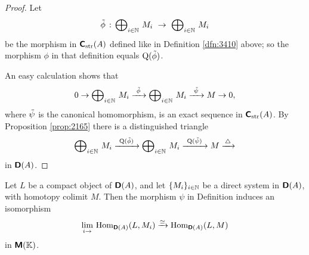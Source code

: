 \begin{proof}
Let 
\[ \til{\phi} \, : \, \bigoplus\nolimits_{i \in \N} \, M_i \ \to \ 
\bigoplus\nolimits_{i \in \N} \, M_i \]
be the morphism in $\boldsymbol{\mathsf{C}}_{\mathrm{str}}(A)$ defined like in Definition 
\ref{dfn:3410} above; so the morphism $\phi$ in that definition equals 
$\operatorname{Q}(\tilde{\phi})$. 

An easy calculation shows that 
\[ 0 \to \bigoplus\nolimits_{i \in \mathbb{N}} \, M_i \xrightarrow{\ \tilde{\phi} \ } 
\bigoplus\nolimits_{i \in \mathbb{N}} \, M_i \xrightarrow{\ \tilde{\psi} \ } M \to 0 , \] 
where $\tilde{\psi}$ is the canonical homomorphism, is an exact sequence in 
$\boldsymbol{\mathsf{C}}_{\mathrm{str}}(A)$. 
By Proposition \ref{prop:2165} there is a distinguished triangle 
\[ \bigoplus\nolimits_{i \in \mathbb{N}} \, M_i \xrightarrow{\ \operatorname{Q}(\tilde{\phi}) \ } 
\bigoplus\nolimits_{i \in \mathbb{N}} \, M_i \xrightarrow{\ \operatorname{Q}(\tilde{\psi}) \ } M 
\xrightarrow{ \, \triangle \, } \]
in $\boldsymbol{\mathsf{D}}(A)$. 
\end{proof}

\begin{lem} \label{lem:3410} 
Let $L$ be a compact object of $\boldsymbol{\mathsf{D}}(A)$, and 
let $\{ M_i \}_{i \in \mathbb{N}}$ be a direct system in $\boldsymbol{\mathsf{D}}(A)$, with homotopy 
colimit $M$. Then the morphism $\psi$ in Definition \tup{\ref{dfn:3410}}
induces an isomorphism
\[ \lim_{i \to} \, \operatorname{Hom}_{\boldsymbol{\mathsf{D}}(A)}(L, M_i) \xrightarrow{\simeq} 
\operatorname{Hom}_{\boldsymbol{\mathsf{D}}(A)}(L, M) \]
in $\boldsymbol{\mathsf{M}}(\mathbb{K})$. 
\end{lem}

